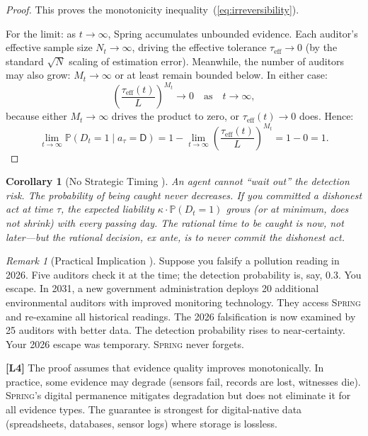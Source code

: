 \documentclass[11pt,a4paper]{article}
\newtheorem{corollary}[theorem]{Corollary}
\theoremstyle{definition}
\theoremstyle{remark}
\newtheorem{remark}[theorem]{Remark}
\newcommand{\limitationTag}[1]{\textsf{\textbf{[L#1]}}}
\newcommand{\Spring}{\textsc{Spring}}
\newcommand{\Pbb}{\mathbb{P}}
\newcommand{\dishonest}{\mathsf{D}}
\newcommand{\threshold}{\tau}
\newcommand{\tol}{L}
\newcommand{\cost}{\kappa}
\begin{document}
\begin{proof}
This proves the monotonicity inequality~(\ref{eq:irreversibility}).

For the limit: as $t \to \infty$, Spring accumulates unbounded evidence. Each auditor's effective sample size $N_t \to \infty$, driving the effective tolerance $\threshold_{\text{eff}} \to 0$ (by the standard $\sqrt{N}$ scaling of estimation error). Meanwhile, the number of auditors may also grow: $M_t \to \infty$ or at least remain bounded below. In either case:
\begin{equation}
    \left(\frac{\threshold_{\text{eff}}(t)}{\tol}\right)^{M_t} \to 0 \quad \text{as} \quad t \to \infty,
\end{equation}
because either $M_t \to \infty$ drives the product to zero, or $\threshold_{\text{eff}}(t) \to 0$ does. Hence:
\begin{equation}
    \lim_{t \to \infty} \Pbb(D_t = 1 \mid a_\tau = \dishonest)
    = 1 - \lim_{t \to \infty} \left(\frac{\threshold_{\text{eff}}(t)}{\tol}\right)^{M_t}
    = 1 - 0 = 1.
\end{equation}
\end{proof}

\begin{corollary}[No Strategic Timing ]
\label{cor:no_timing}
An agent cannot ``wait out'' the detection risk. The probability of being caught never decreases. If you committed a dishonest act at time $\tau$, the expected liability $\cost \cdot \Pbb(D_t = 1)$ grows (or at minimum, does not shrink) with every passing day. The rational time to be caught is now, not later---but the rational decision, ex ante, is to never commit the dishonest act.
\end{corollary}

\begin{remark}[Practical Implication ]
\label{rem:practical_spring}
Suppose you falsify a pollution reading in 2026. Five auditors check it at the time; the detection probability is, say, 0.3. You escape. In 2031, a new government administration deploys 20 additional environmental auditors with improved monitoring technology. They access \Spring{} and re-examine all historical readings. The 2026 falsification is now examined by 25 auditors with better data. The detection probability rises to near-certainty. Your 2026 escape was temporary. \Spring{} never forgets.
\end{remark}

\limitationTag{4} The proof assumes that evidence quality improves monotonically. In practice, some evidence may degrade (sensors fail, records are lost, witnesses die). \Spring{}'s digital permanence mitigates degradation but does not eliminate it for all evidence types. The guarantee is strongest for digital-native data (spreadsheets, databases, sensor logs) where storage is lossless.
\end{document}
